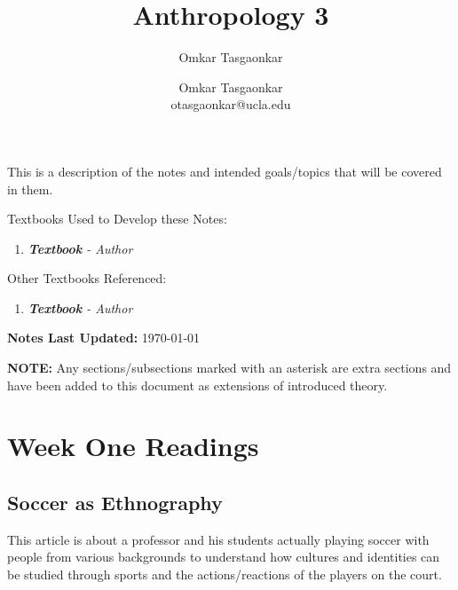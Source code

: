 \documentclass[10pt,letterpaper]{article} %
\author{Omkar Tasgaonkar}
\title{Anthropology 3}
\author{Omkar Tasgaonkar \\ \small otasgaonkar@ucla.edu}
\date{}
\begin{document}
\maketitle
This is a description of the notes and intended goals/topics that will be covered in them.

\begin{tcolorbox}[colback=white, colframe=black, arc=0mm]
Textbooks Used to Develop these Notes:
\begin{enumerate}
\item \textit{\textbf{Textbook} - Author}
\end{enumerate}
Other Textbooks Referenced:
\begin{enumerate}
\item \textit{\textbf{Textbook} - Author}
\end{enumerate}
\end{tcolorbox}
\begin{tcolorbox}[colback=white, colframe=black, arc=0mm]
\textbf{Notes Last Updated:} \today
\end{tcolorbox}
\thispagestyle{firstpage}
\newpage
\begin{tcolorbox}[colback=white, colframe=black, arc=0mm]
\tableofcontents
\end{tcolorbox}
\textbf{NOTE:} Any sections/subsections marked with an asterisk are extra sections and have been added to this document as extensions of introduced theory.
\pagebreak
 
\section{Week One Readings}
\subsection{Soccer as Ethnography}
This article is about a professor and his students actually playing soccer with people from various backgrounds to understand how cultures and identities
can be studied through sports and the actions/reactions of the players on the court.
\end{document}

